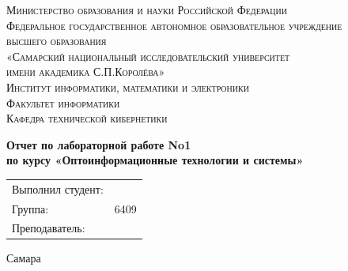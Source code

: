 \begin{titlepage}
							
	\center
							
							
	\textsc{Министерство образования и науки Российской Федерации}\\[-0.15cm]
	\textsc{Федеральное государственное автономное образовательное учреждение \\[-0.15cm] высшего образования}\\[-0.15cm] 
	\textsc{«Самарский национальный исследовательский университет \\[-0.15cm] имени академика С.П.Королёва»}\\[0.5cm]
	\textsc{Институт информатики, математики и электроники}\\[-0.7em]
	\textsc{Факультет информатики}\\[-0.7em]
	\textsc{Кафедра технической кибернетики}\\[-1em]
						
							
	\vfill\vfill
						    
							
	{\textbf{Отчет по лабораторной работе No1}}\\[-0.7em]
	{\textbf{по курсу «Оптоинформационные технологии и системы»}}
	
    \vfill\vfill\vfill\vfill\vfill\vfill\vfill\vfill\vfill
							
	\begin{minipage}{1\textwidth}
		\begin{center}
			\begin{tabularx}{\textwidth}{X l}
				Выполнил студент:        & \firstAuthorSurName \firstAuthorInitials \\
				Группа:                    & 6409                     		           \\
				Преподаватель:                  & \teacherName         		                \\
			\end{tabularx}
		\end{center}
	\end{minipage}
							
						
							
	\vfill\vfill\vfill
					
	{\centering Самара \the\year}
							
							
\end{titlepage}

